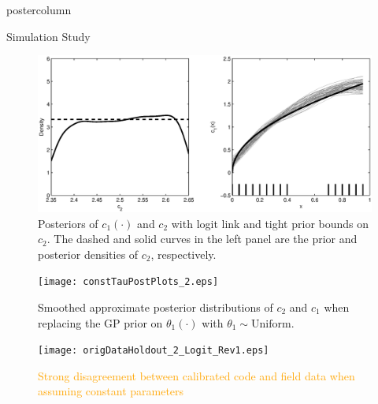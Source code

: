 \documentclass[final,10pt]{beamer}  %
\begin{document}
\begin{frame}{}
\begin{columns}[t]
\begin{column}{.33\textwidth}
\begin{beamercolorbox}[center,wd=1.475\textwidth]{postercolumn}
\begin{minipage}[T]{\textwidth}
{\begin{block}{Simulation Study}
{        \begin{figure}[tb]
            \centering
            \includegraphics[scale= 0.6, clip= TRUE, trim= 0in 0pt 0in 0in]{strongN0PostPlots_2_Logit.eps}  %
            \caption{{\small Posteriors of $c_1(\cdot)$ and $c_2$ with logit link and tight prior bounds on $c_2$. The dashed and solid curves in the left panel are the prior and posterior densities of $c_2$, respectively. }}%
        \end{figure}



        \begin{figure}[tb]
            \centering
            \texttt{[image: constTauPostPlots\_2.eps]}  %
            \caption{Smoothed approximate posterior distributions of $c_2$ and $c_1$ when replacing the GP prior on $\theta_1(\cdot)$ with $\theta_1 \sim \text{Uniform}$.}%
        \end{figure}


        \begin{figure}[tb]
            \centering
            \texttt{[image: origDataHoldout\_2\_Logit\_Rev1.eps]}  %
            \caption{\textcolor{orange}{Strong disagreement between calibrated code and field data when assuming constant parameters}}%
        \end{figure}
        }
        \end{block}
        \vfill

}
\end{minipage}
\end{beamercolorbox}
\end{column}
\end{columns}
\end{frame}
\end{document}
